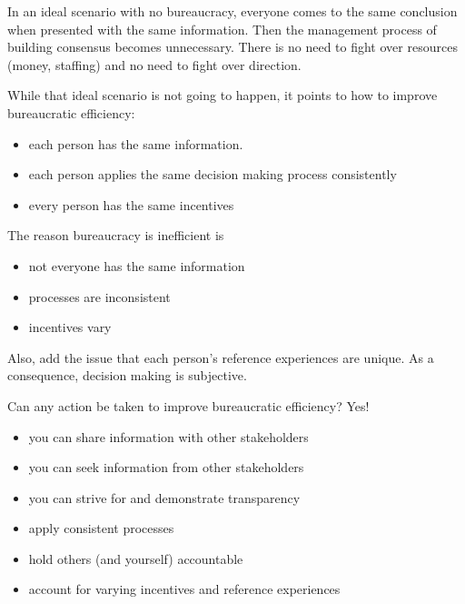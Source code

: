 
In an ideal scenario with no bureaucracy, everyone comes to the same conclusion when presented with the same information. Then the management process of building consensus becomes unnecessary. There is no need to fight over resources (money, staffing) and no need to fight over direction.

While that ideal scenario is not going to happen, it points to how to improve bureaucratic efficiency:
\begin{itemize}
\item each person has the same information. 
\item each person applies the same decision making process consistently
\item every person has the same incentives
\end{itemize}
The reason bureaucracy is inefficient is
\begin{itemize}
\item not everyone has the same information
\item processes are inconsistent
\item incentives vary
\end{itemize}
Also, add the issue that each person's reference experiences are unique. As a consequence, decision making is subjective. 

Can any action be taken to improve bureaucratic efficiency? Yes!
\begin{itemize}
\item you can share information with other stakeholders
\item you can seek information from other stakeholders
\item you can strive for and demonstrate transparency
\item apply consistent processes 
\item hold others (and yourself) accountable 
\item account for varying incentives and reference experiences
\end{itemize}
